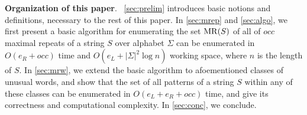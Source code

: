 
\textbf{Organization of this paper}.\ 
\cref{sec:prelim} introduces basic notions and definitions, necessary to the rest of this paper. 
In \cref{sec:mrep} and \cref{sec:algo}, we first present a basic algorithm for enumerating the set $\mathrm{MR}(S)$ of all of $occ$ maximal repeats of a string $S$ over alphabet $\Sigma$ can be enumerated in $O(e_R + occ)$ time and $O(e_L  + |\Sigma|^2 \log n)$ working space, where $n$ is the length of $S$. 
In \cref{sec:mrw}, we extend the basic algorithm to afoementioned classes of unusual words, and show that the set of all patterns of a string $S$ within any of these classes can be enumerated in $O(e_L + e_R + occ)$ time, and give its correctness and computational complexity.
In \cref{sec:conc}, we conclude. 

